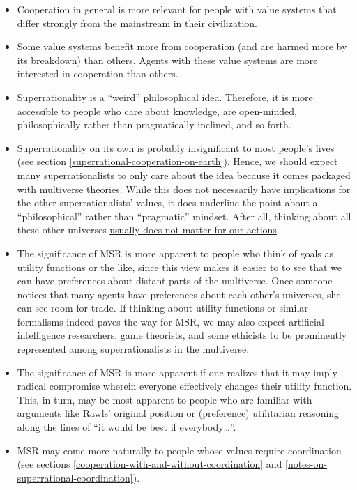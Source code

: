 \begin{itemize}
\item
  Cooperation in general is more relevant for people with value systems
  that differ strongly from the mainstream in their civilization.
\item
  Some value systems benefit more from cooperation (and are harmed more
  by its breakdown) than others. Agents with these value systems are
  more interested in cooperation than others.
\item
  Superrationality is a ``weird'' philosophical idea. Therefore, it is
  more accessible to people who care about knowledge, are open-minded,
  philosophically rather than pragmatically inclined, and so forth.
\item
  Superrationality on its own is probably insignificant to most people's
  lives (see section
  \ref{superrational-cooperation-on-earth}). Hence, we should expect many
  superrationalists to only care about the idea because it comes
  packaged with multiverse theories. While this does not necessarily
  have implications for the other superrationalists' values, it does
  underline the point about a ``philosophical'' rather than
  ``pragmatic'' mindset. After all, thinking about all these other
  universes
  \href{http://lesswrong.com/lw/qz/living_in_many_worlds/}{usually
  does not matter for our actions}.
\item
  The significance of MSR is more apparent to people who think of goals
  as utility functions or the like, since this view makes it easier to
  to see that we can have preferences about distant parts of the
  multiverse. Once someone notices that many agents have preferences
  about each other's universes, she can see room for trade. If thinking
  about utility functions or similar formalisms indeed paves the way for
  MSR, we may also expect artificial intelligence researchers, game
  theorists, and some ethicists to be prominently represented among
  superrationalists in the multiverse.
\item
  The significance of MSR is more apparent if one realizes that it may
  imply radical compromise wherein everyone effectively changes their
  utility function. This, in turn, may be most apparent to people who
  are familiar with arguments like
  \href{https://en.wikipedia.org/wiki/Original_position}{Rawls'
  original position} \parencite{Freeman2016-kg} or
  \href{https://en.wikipedia.org/wiki/Preference_utilitarianism}{(preference)
  utilitarian} reasoning along the lines of ``it would be best if
  everybody\ldots{}''.
\item
  MSR may come more naturally to people whose values require
  coordination (see sections
  \ref{cooperation-with-and-without-coordination} and
  \ref{notes-on-superrational-coordination}).
\end{itemize}


